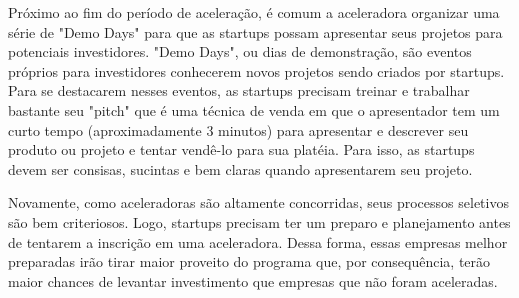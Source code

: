 Próximo ao fim do período de aceleração, é comum a aceleradora organizar uma série de "Demo Days" para que as startups possam apresentar seus projetos para potenciais investidores. "Demo Days", ou dias de demonstração, são eventos próprios para investidores conhecerem novos projetos sendo criados por startups. Para se destacarem nesses eventos, as startups precisam treinar e trabalhar bastante seu "pitch" que é uma técnica de venda em que o apresentador tem um curto tempo (aproximadamente 3 minutos) para apresentar e descrever seu produto ou projeto e tentar vendê-lo para sua platéia. Para isso, as startups devem ser consisas, sucintas e bem claras quando apresentarem seu projeto.

Novamente, como aceleradoras são altamente concorridas, seus processos seletivos são bem criteriosos. Logo, startups precisam ter um preparo e planejamento antes de tentarem a inscrição em uma aceleradora. Dessa forma, essas empresas melhor preparadas irão tirar maior proveito do programa que, por consequência, terão maior chances de levantar investimento que empresas que não foram aceleradas.
